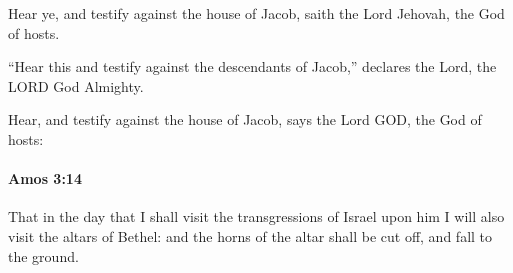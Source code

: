 			\begin{versebox}
					\item[BHS] 
					\item[LXX] 
					\item[ASV] Hear ye, and testify against the house of Jacob, saith the Lord Jehovah, the God of hosts.
					\item[NIV] “Hear this and testify against the descendants of Jacob,” declares the Lord, the LORD God Almighty.
					\item[NRSV] Hear, and testify against the house of Jacob, says the Lord GOD, the God of hosts:
			\end{versebox}

		\paragraph{Amos 3:14} %
			\label{AMOS-3-14}

			That in the day that I shall visit the transgressions of Israel upon him I will also visit the altars of Bethel: and the horns of the altar shall be cut off, and fall to the ground.

